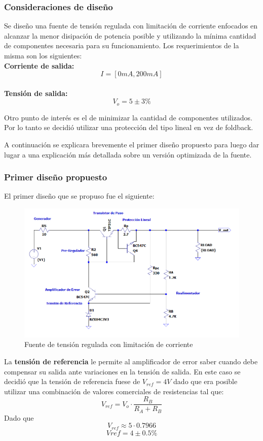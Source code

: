 


	
\subsubsection{Consideraciones de diseño}
Se diseño una fuente de tensión regulada con limitación de corriente enfocados en alcanzar la menor disipación de potencia posible y utilizando la mínima cantidad de componentes necesaria para su funcionamiento.
Los requerimientos de la misma son los siguientes:
\\ 
\textbf{Corriente de salida:}
\begin{equation}
	I = [0mA, 200mA]
\end{equation}
\\
\textbf{Tensión de salida:}
\begin{equation}
V_{o} = 5 \pm 3\%
\end{equation}

Otro punto de interés es el de minimizar la cantidad de componentes utilizados. Por lo tanto se decidió utilizar una protección del tipo lineal en vez de foldback.

A continuación se explicara brevemente el primer diseño propuesto para luego dar lugar a una explicación más detallada sobre un versión optimizada de la fuente.

\subsubsection{Primer diseño propuesto}
El primer diseño que se propuso fue el siguiente:
\begin{figure}[H]
	\centering
	\includegraphics[width=0.7\linewidth]{ImagenesEjercicio1/ImagenCircuitoFV}
	\caption{Fuente de tensión regulada con limitación de corriente}
	\label{fig:imagencircuito}
\end{figure}

La \textbf{tensión de referencia} le permite al amplificador de error saber cuando debe compensar su salida ante variaciones en la tensión de salida. 
En este caso se decidió que la tensión de referencia fuese de $V_{ref} = 4V$ dado que era posible utilizar una combinación de valores comerciales de resistencias tal que:
\begin{equation}
	V_{ref}  = V_{o} \cdot \frac{R_B}{R_A + R_B}
\end{equation} 
Dado que 
\begin{equation}
	V_{ref} \approx 5 \cdot 0.7966
\end{equation}
\begin{equation}
	V{ref} = 4 \pm 0.5 \%
\end{equation}

